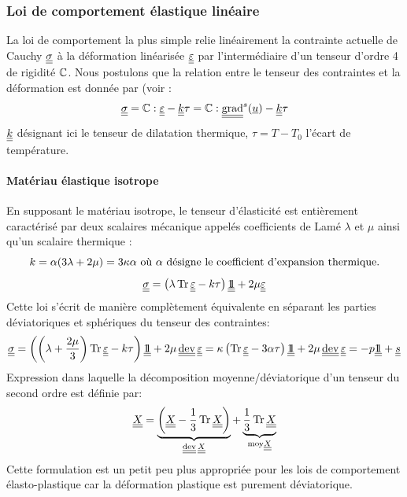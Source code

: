 \documentclass[10pt]{book}
\begin{document}
\begin{appendices}
\subsubsection{Loi de comportement élastique linéaire}
La loi de comportement la plus simple relie linéairement la contrainte actuelle de Cauchy $\underline{\underline{\sigma}}$ à la déformation linéarisée $\underline{\underline{\varepsilon}}$ par l'intermédiaire d'un tenseur d'ordre 4 de \og rigidité \fg{} $\mathbb{C}$. Nous postulons que la relation entre le tenseur des contraintes et la déformation est donnée par (voir \cite{salenccon2005mecanique, forest2015mecanique}:
\begin{equation}
\SC = \RigiLin:\DefoHPP-\ten{k} \tau=\RigiLin:\GradSym(\Dep)-\ten{k} \tau
\label{eq:elasticité_lineaire_thermo}
\end{equation}
$\underline{\underline{k}}$ désignant ici le tenseur de dilatation thermique, $\tau=T-T_{0}$ l'écart de température.
\paragraph{Matériau élastique isotrope} En supposant le matériau isotrope, le tenseur d'élasticité est entièrement caractérisé par deux scalaires \og mécanique \fg{} appelés \og coefficients de Lamé \fg{} $\lambda$ et $\mu$ ainsi qu'un scalaire \og thermique \fg{}:
\begin{equation}
k=\alpha(3\lambda+2\mu)=3\kappa\alpha \text{ où }\alpha\text{ désigne le coefficient d’expansion thermique.}
\label{eq:defi_coeff_expansion_thermique}
\end{equation}
\begin{equation}
\SC = \left(\lambda\tr\DefoHPP-k\tau\right)\TU +2\mu\DefoHPP
\label{eq:elasticité_lineaire_thermo_iso}
\end{equation}
Cette loi s'écrit de manière complètement équivalente en séparant les parties déviatoriques et sphériques du tenseur des contraintes:
\begin{equation}
\SC = \left(\left(\lambda+\dfrac{2\mu}{3}\right)\tr\DefoHPP-k\tau\right)\TU +2\mu\dev\DefoHPP= \BulkModulus\left(\tr\DefoHPP-3\alpha\tau\right)\TU +2\mu\dev\DefoHPP=-p\TU+\devia
\label{eq:scission_lin_dev_sph_iso}
\end{equation}
Expression dans laquelle la décomposition moyenne/déviatorique d'un tenseur du second ordre est définie par:
$$\ten{X}=\underbrace{\left(\ten{X}-\dfrac{1}{3}\tr\ten{X}\right)}_{\dev\ten{X}}+\underbrace{\dfrac{1}{3}\tr\ten{X}}_{\mathrm{moy}\ten{X}}$$
Cette formulation est un petit peu plus appropriée pour les lois de comportement élasto-plastique car  la déformation plastique est purement déviatorique.\\


\end{appendices}
\end{document}
